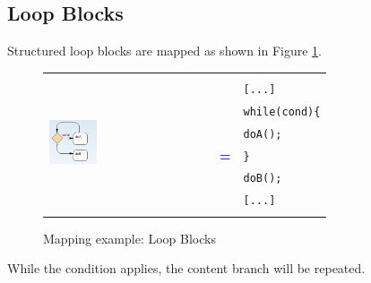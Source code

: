\subsection{Loop Blocks}
Structured loop blocks are mapped as shown in Figure \ref{fig:mapping_loop}.
\begin{figure}[h]
\begin{tabularx}{\linewidth}{lcX}
	\multirow{8}{*}{\includegraphics[width=0.3\textwidth]{images/mapping/loop_block.png}} &  &\\
	& & \texttt{[...]}\\
	& & \texttt{while(cond)\{}\\
	& & \texttt{\hspace{10pt}doA();}\\
	& \textbf{\textcolor{blue}{=}} & \texttt{\}}\\
	& & \texttt{doB();}\\
	& & \texttt{[...]}\\
	& & \\
\end{tabularx}
\caption{Mapping example: Loop Blocks }%
\label{fig:mapping_loop}%
\end{figure}

While the condition applies, the content branch will be repeated. 

